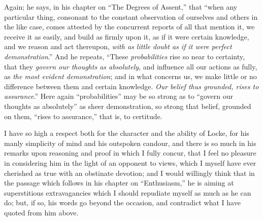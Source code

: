 Again; he says, in his chapter on ``The Degrees of
Assent,'' that ``when any particular thing, consonant to the
constant observation of ourselves and others in the like case, comes
attested by the concurrent reports of all that mention it, we receive
it as easily, and build as firmly upon it, as if it were certain
knowledge, and we reason and act thereupon, \emph{with as little doubt as
if it were perfect demonstration}.'' And he repeats,
``These \emph{probabilities} rise so near to certainty, that they \emph{govern
our thoughts as absolutely}, and influence all our actions as
fully, as \emph{the most evident demonstration}; and in what concerns
us, we make little or no difference between them and certain
knowledge. \emph{Our belief thus grounded, rises to assurance}.''
Here again ``probabilities'' may be so strong as to
``govern our thoughts as absolutely'' as sheer demonstration,
so strong that belief, grounded on them, ``rises to
assurance,'' that is, to certitude.

I have so high a respect both for the character and the ability of
Locke, for his manly simplicity of mind and his outspoken candour, and
there is so much in his remarks upon reasoning and proof in which I
fully concur, that I feel no pleasure in considering him in the light
of an opponent to views, which I myself have ever cherished as true
with an obstinate devotion; and I would willingly think that in the
passage which follows in his chapter on ``Enthusiasm,'' he is
aiming at superstitious extravagancies which I should repudiate myself
as much as he can do; but, if so, his words go beyond the occasion,
and contradict what I have quoted from him above.

